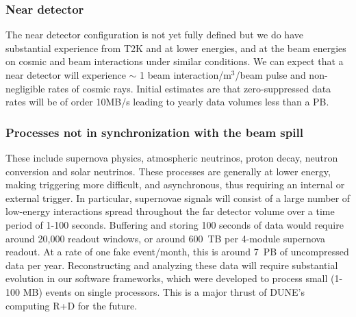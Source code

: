 \subsubsection{ Near detector} The near detector configuration is not yet fully defined  but we do have substantial experience from T2K and   at lower energies, and   at the   beam energies on cosmic and beam interactions under similar conditions.  We can expect that a near detector will experience $\sim$ 1 beam interaction/m$^3$/beam pulse and non-negligible rates of cosmic rays. Initial estimates are that zero-suppressed data rates will be of order 10MB/s leading to yearly data volumes less than a PB.  %






\subsubsection{Processes not in synchronization with the beam spill} These include supernova physics, atmospheric neutrinos, proton decay, neutron conversion and solar neutrinos.  These processes are generally at lower energy, making triggering more difficult, and asynchronous, thus requiring an internal or external trigger.  In particular, supernovae signals will consist of a large number of low-energy interactions spread throughout the far detector volume over a time period of 1-100 seconds. Buffering and storing 100 seconds of data would require around 20,000 readout windows, or around 600~TB per 4-module supernova readout.  At a rate of one fake  event/month, this is around 7~PB of uncompressed data per year.  Reconstructing and analyzing these data will require substantial evolution in our software frameworks, which were developed to process small (1-100 MB) events on single processors. This is a major thrust of DUNE's computing R+D for the future. 

